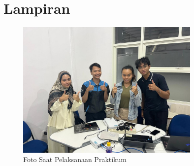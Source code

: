\section*{Lampiran} %

\begin{figure}[H]
    \centering
    \includegraphics[width=0.8\textwidth]{img/Foto Keren.jpeg}
    \caption{Foto Saat Pelaksanaan Praktikum}
    \label{fig:foto_keren}
\end{figure}